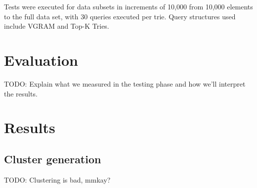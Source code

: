 \documentclass[pdftex,12pt,letter]{article}
\begin{document}
Tests were executed for data subsets in increments of 10,000 from 10,000 elements to the full data set, with 30 queries executed per trie. Query structures used include VGRAM and Top-K Tries.

\section{Evaluation}
TODO: Explain what we measured in the testing phase and how we'll interpret the results.

\newpage
\section{Results}
\subsection{Cluster generation}
TODO: Clustering is bad, mmkay?
\end{document}
